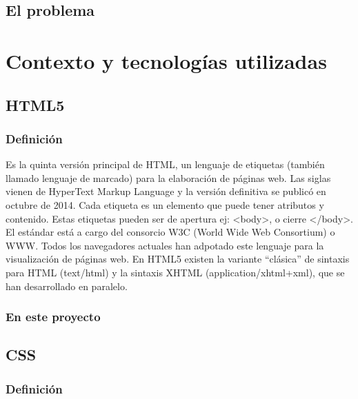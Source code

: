 \documentclass[a4paper, 12pt]{book}
\begin{document}
\section{El problema}
\label{sec:ElProblema}


\cleardoublepage
\chapter{Contexto y tecnolog\'ias utilizadas}
\label{sec:tecno} %



\section{HTML5}
\label{sec:html5}
\subsection{Definici\'on}

Es la quinta versión principal de HTML, un lenguaje de etiquetas (también llamado lenguaje de marcado) para la elaboración de páginas web. Las siglas vienen de HyperText Markup Language y la versión definitiva se publicó en octubre de 2014. Cada etiqueta es un elemento que puede tener atributos y contenido. Estas etiquetas pueden ser de apertura ej: <body>, o cierre </body>. El estándar está a cargo del consorcio W3C (World Wide Web Consortium) o WWW. Todos los navegadores actuales han adpotado este lenguaje para la visualización de páginas web. En HTML5 existen la variante “clásica” de sintaxis para HTML (text/html) y la sintaxis XHTML (application/xhtml+xml), que se han desarrollado en paralelo.
\subsection{En este proyecto}


\section{CSS}
\label{sec:css}
\subsection{Definici\'on}
\end{document}
